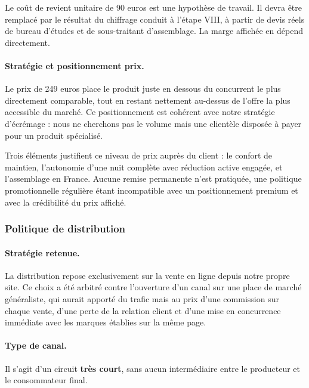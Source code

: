 \begin{hypothese}
Le coût de revient unitaire de 90 euros est une hypothèse de travail. Il devra
être remplacé par le résultat du chiffrage conduit à l'étape VIII, à partir de
devis réels de bureau d'études et de sous-traitant d'assemblage. La marge
affichée en dépend directement.
\end{hypothese}

\paragraph{Stratégie et positionnement prix.}
Le prix de 249 euros place le produit juste en dessous du concurrent le plus
directement comparable, tout en restant nettement au-dessus de l'offre la plus
accessible du marché. Ce positionnement est cohérent avec notre stratégie
d'écrémage : nous ne cherchons pas le volume mais une clientèle disposée à payer
pour un produit spécialisé.

Trois éléments justifient ce niveau de prix auprès du client : le confort de
maintien, l'autonomie d'une nuit complète avec réduction active engagée, et
l'assemblage en France. Aucune remise permanente n'est pratiquée, une politique
promotionnelle régulière étant incompatible avec un positionnement premium et
avec la crédibilité du prix affiché.

\subsubsection{Politique de distribution}

\paragraph{Stratégie retenue.}
La distribution repose exclusivement sur la vente en ligne depuis notre propre
site. Ce choix a été arbitré contre l'ouverture d'un canal sur une place de
marché généraliste, qui aurait apporté du trafic mais au prix d'une commission
sur chaque vente, d'une perte de la relation client et d'une mise en
concurrence immédiate avec les marques établies sur la même page.

\paragraph{Type de canal.}
Il s'agit d'un circuit \textbf{très court}, sans aucun intermédiaire entre le
producteur et le consommateur final.

